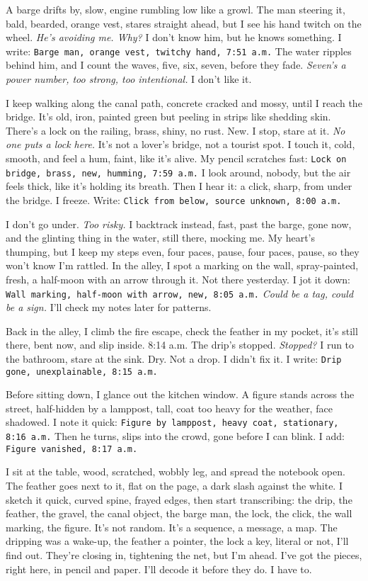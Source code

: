\documentclass[12pt,oneside]{book} %
\newcommand{\note}[1]{\texttt{#1}}
\begin{document}
A barge drifts by, slow, engine rumbling low like a growl. The man steering it, bald, bearded, orange vest, stares straight ahead, but I see his hand twitch on the wheel. \textit{He’s avoiding me. Why?} I don’t know him, but he knows something. I write: \note{Barge man, orange vest, twitchy hand, 7:51 a.m.} The water ripples behind him, and I count the waves, five, six, seven, before they fade. \textit{Seven’s a power number, too strong, too intentional.} I don’t like it.

I keep walking along the canal path, concrete cracked and mossy, until I reach the bridge. It’s old, iron, painted green but peeling in strips like shedding skin. There’s a lock on the railing, brass, shiny, no rust. New. I stop, stare at it. \textit{No one puts a lock here.} It’s not a lover’s bridge, not a tourist spot. I touch it, cold, smooth, and feel a hum, faint, like it’s alive. My pencil scratches fast: \note{Lock on bridge, brass, new, humming, 7:59 a.m.} I look around, nobody, but the air feels thick, like it’s holding its breath. Then I hear it: a click, sharp, from under the bridge. I freeze. Write: \note{Click from below, source unknown, 8:00 a.m.}

I don’t go under. \textit{Too risky.} I backtrack instead, fast, past the barge, gone now, and the glinting thing in the water, still there, mocking me. My heart’s thumping, but I keep my steps even, four paces, pause, four paces, pause, so they won’t know I’m rattled. In the alley, I spot a marking on the wall, spray-painted, fresh, a half-moon with an arrow through it. Not there yesterday. I jot it down: \note{Wall marking, half-moon with arrow, new, 8:05 a.m.} \textit{Could be a tag, could be a sign.} I’ll check my notes later for patterns.

Back in the alley, I climb the fire escape, check the feather in my pocket, it’s still there, bent now, and slip inside. 8:14 a.m. The drip’s stopped. \textit{Stopped?} I run to the bathroom, stare at the sink. Dry. Not a drop. I didn’t fix it. I write: \note{Drip gone, unexplainable, 8:15 a.m.}

Before sitting down, I glance out the kitchen window. A figure stands across the street, half-hidden by a lamppost, tall, coat too heavy for the weather, face shadowed. I note it quick: \note{Figure by lamppost, heavy coat, stationary, 8:16 a.m.} Then he turns, slips into the crowd, gone before I can blink. I add: \note{Figure vanished, 8:17 a.m.}

I sit at the table, wood, scratched, wobbly leg, and spread the notebook open. The feather goes next to it, flat on the page, a dark slash against the white. I sketch it quick, curved spine, frayed edges, then start transcribing: the drip, the feather, the gravel, the canal object, the barge man, the lock, the click, the wall marking, the figure. It’s not random. It’s a sequence, a message, a map. The dripping was a wake-up, the feather a pointer, the lock a key, literal or not, I’ll find out. They’re closing in, tightening the net, but I’m ahead. I’ve got the pieces, right here, in pencil and paper. I’ll decode it before they do. I have to.
\end{document}
